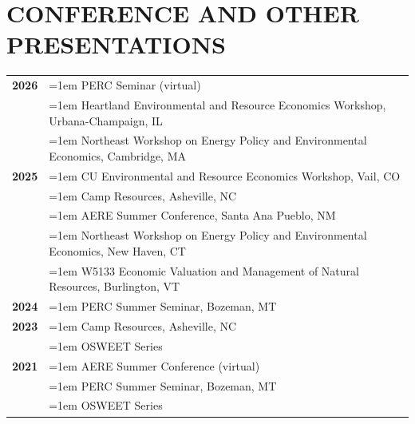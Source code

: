 \documentclass[11pt]{article}
\begin{document}
\section*{CONFERENCE AND OTHER PRESENTATIONS}
\begin{longtable}{>{\bfseries}r >{\raggedright\arraybackslash\hangindent=1em\hangafter=1}p{5.8in}}%
2026 & PERC Seminar (virtual) \\
    & Heartland Environmental and Resource Economics Workshop, Urbana-Champaign, IL \\
    & Northeast Workshop on Energy Policy and Environmental Economics, Cambridge, MA \\[1ex]
2025 & CU Environmental and Resource Economics Workshop, Vail, CO \\
    & Camp Resources, Asheville, NC \\
    & AERE Summer Conference, Santa Ana Pueblo, NM \\
    & Northeast Workshop on Energy Policy and Environmental Economics, New Haven, CT \\
    & W5133 Economic Valuation and Management of Natural Resources, Burlington, VT \\[1ex]
2024 & PERC Summer Seminar, Bozeman, MT \\[1ex]
2023 & Camp Resources, Asheville, NC \\
    & OSWEET Series \\[1ex]
2021 & AERE Summer Conference (virtual) \\
    & PERC Summer Seminar, Bozeman, MT \\
    & OSWEET Series \\
\end{longtable}
\end{document}
